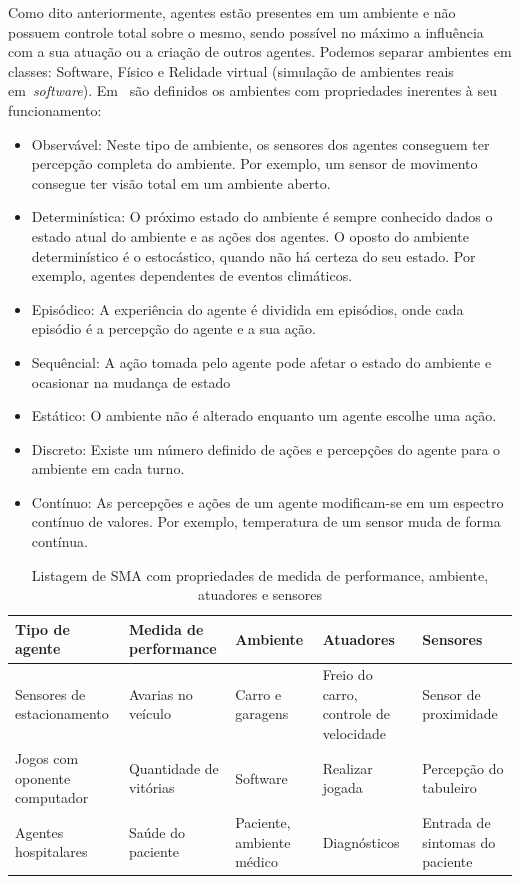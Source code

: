 Como dito anteriormente, agentes estão presentes em um ambiente e não possuem controle total sobre o mesmo, sendo possível no máximo a influência com a sua atuação ou a criação de outros agentes. Podemos separar ambientes em classes: Software, Físico e Relidade virtual (simulação de ambientes reais em~\emph{software}). Em~\cite{wooldridge04} são definidos os ambientes com propriedades inerentes à seu funcionamento:

\begin{itemize}
	\item Observável: Neste tipo de ambiente, os sensores dos agentes conseguem ter percepção completa do ambiente. Por exemplo, um sensor de movimento consegue ter visão total em um ambiente aberto.
	\item Determinística: O próximo estado do ambiente é sempre conhecido dados o estado atual do ambiente e as ações dos agentes. O oposto do ambiente determinístico é o estocástico, quando não há certeza do seu estado. Por exemplo, agentes dependentes de eventos climáticos.
	\item Episódico: A experiência do agente é dividida em episódios, onde cada episódio é a percepção do agente e a sua ação.
	\item Sequêncial: A ação tomada pelo agente pode afetar o estado do ambiente e ocasionar na mudança de estado
	\item Estático: O ambiente não é alterado enquanto um agente escolhe uma ação.
	\item Discreto: Existe um número definido de ações e percepções do agente para o ambiente em cada turno.
	\item Contínuo: As percepções e ações de um agente modificam-se em um espectro contínuo de valores. Por exemplo, temperatura de um sensor muda de forma contínua.
\end{itemize}

\begin{table}
	\caption{Listagem de SMA com propriedades de medida de performance, ambiente, atuadores e sensores}
	\begin{tabular}{|p{3cm} | p{3cm} | p{2cm}| p{3cm} | p{3cm} |}
		\hline
		\textbf{Tipo de agente}	& \textbf{Medida de performance} & \textbf{Ambiente} & \textbf{Atuadores}  & \textbf{Sensores}	\\
		\hline
		Sensores de estacionamento	& Avarias no veículo & Carro e garagens & Freio do carro, controle de velocidade & Sensor de proximidade	\\
		\hline
		Jogos com oponente computador	& Quantidade de vitórias &	Software & Realizar jogada & Percepção do tabuleiro	\\
		\hline
		Agentes hospitalares		& Saúde do paciente & Paciente, ambiente médico & Diagnósticos & Entrada de sintomas do paciente	\\
		\hline
	\end{tabular}
	\label{lista_agentes}
\end{table}
 
